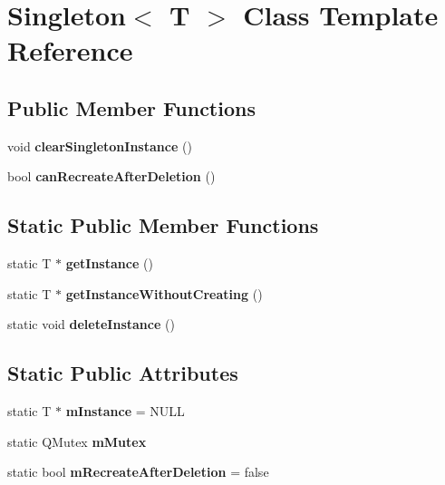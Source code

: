 \hypertarget{class_singleton}{\section{Singleton$<$ T $>$ Class Template Reference}
\label{class_singleton}
}
\subsection*{Public Member Functions}
\begin{DoxyCompactItemize}
\item 
\hypertarget{class_singleton_a0329ad2cc0edf3c2a33d6deb8129a488}{void {\bfseries clear\-Singleton\-Instance} ()}\label{class_singleton_a0329ad2cc0edf3c2a33d6deb8129a488}

\item 
\hypertarget{class_singleton_ac4a5940e330c8b8f4508e56786551196}{bool {\bfseries can\-Recreate\-After\-Deletion} ()}\label{class_singleton_ac4a5940e330c8b8f4508e56786551196}

\end{DoxyCompactItemize}
\subsection*{Static Public Member Functions}
\begin{DoxyCompactItemize}
\item 
\hypertarget{class_singleton_ad6f103597095efda360db4a230308666}{static T $\ast$ {\bfseries get\-Instance} ()}\label{class_singleton_ad6f103597095efda360db4a230308666}

\item 
\hypertarget{class_singleton_af6ff4c7ab975b17b4532710503ab0b09}{static T $\ast$ {\bfseries get\-Instance\-Without\-Creating} ()}\label{class_singleton_af6ff4c7ab975b17b4532710503ab0b09}

\item 
\hypertarget{class_singleton_a26fbf9f73eec1a36cbd8e3767b63d5a7}{static void {\bfseries delete\-Instance} ()}\label{class_singleton_a26fbf9f73eec1a36cbd8e3767b63d5a7}

\end{DoxyCompactItemize}
\subsection*{Static Public Attributes}
\begin{DoxyCompactItemize}
\item 
\hypertarget{class_singleton_a17aff3a9562829897f4a101990c99f0f}{static T $\ast$ {\bfseries m\-Instance} = N\-U\-L\-L}\label{class_singleton_a17aff3a9562829897f4a101990c99f0f}

\item 
\hypertarget{class_singleton_a3b3dbb427513ec5af9594dd652eced4f}{static Q\-Mutex {\bfseries m\-Mutex}}\label{class_singleton_a3b3dbb427513ec5af9594dd652eced4f}

\item 
\hypertarget{class_singleton_a6a0363db735739f94dc19209522317e7}{static bool {\bfseries m\-Recreate\-After\-Deletion} = false}\label{class_singleton_a6a0363db735739f94dc19209522317e7}

\end{DoxyCompactItemize}
